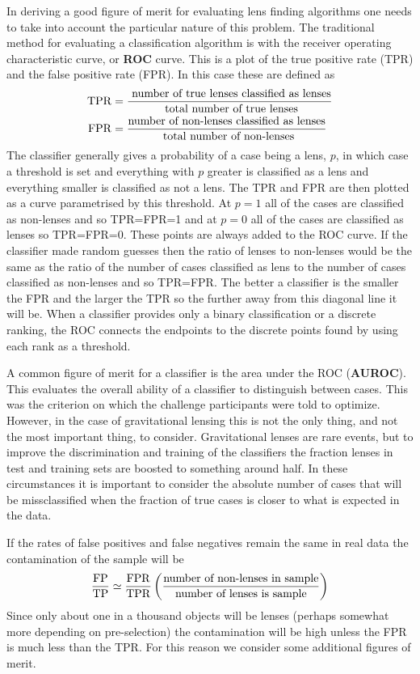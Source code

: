 \documentclass[useAMS,usenatbib]{mnras}
\begin{document}
In deriving a good figure of merit for evaluating lens finding algorithms one needs to take into account the particular nature of this problem.
The traditional method for evaluating a classification algorithm is with the receiver operating characteristic curve, or {\bf ROC} curve.  This is a plot of the true positive rate (TPR) and the false positive rate (FPR).  In this case these are defined as
\begin{align}
{\rm TPR} &= \frac{\textrm{ number of true lenses classified as lenses}}{\textrm{ total number of true lenses}} \\
{\rm FPR} &= \frac{\textrm{number of non-lenses classified as lenses}}{\textrm{ total number of non-lenses}}
\end{align}
The classifier generally gives a probability of a case being a lens, $p$, in which case a threshold is set and everything with $p$ greater is classified as a lens and everything smaller is classified as not a lens.  The TPR and FPR are then plotted as a curve parametrised by this threshold.  At $p=1$ all of the cases are classified as non-lenses and so TPR=FPR=1 and at $p=0$ all of the cases are classified as lenses so TPR=FPR=0.  These points are always added to the ROC curve.  If the classifier made random guesses then the ratio of lenses to non-lenses would be the same as the ratio of the number of cases classified as lens to the number of cases classified as non-lenses and so TPR=FPR.  The better a classifier is the smaller the FPR and the larger the TPR so the further away from this diagonal line it will be.  When a classifier provides only a binary classification or a discrete ranking, the ROC connects the endpoints to the discrete points found by using each rank as a threshold.

A common figure of merit for a classifier is the area under the ROC ({\bf AUROC}).  This evaluates the overall ability of a classifier to distinguish between cases.  This was the criterion on which the challenge participants were told to optimize.  However, in the case of gravitational lensing this is not the only thing, and not the most important thing, to consider.  Gravitational lenses are rare events, but to improve the discrimination and training of the classifiers the fraction lenses in test and training sets are boosted to something around half.  In these circumstances it is important to consider the absolute number of cases that will be missclassified when the fraction of true cases is closer to what is expected in the data.

If the rates of false positives and false negatives remain the same in real data  the contamination of the sample will be
\begin{align}
\frac{\rm FP}{\rm TP} \simeq \frac{\rm FPR}{\rm TPR} \left(\frac{\textrm{number of non-lenses in sample}}{\textrm{number of lenses is sample}} \right)
\end{align}
Since only about one in a thousand objects will be lenses (perhaps somewhat more depending on pre-selection) the contamination will be high unless the FPR is much less than the TPR.  For this reason we consider some additional figures of merit.
\end{document}
